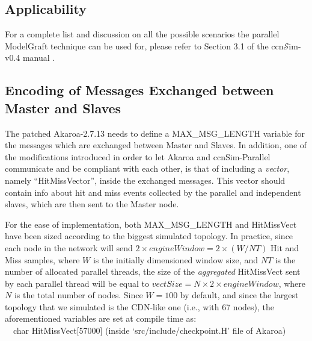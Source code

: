 \documentclass[10pt]{article}
\newcommand{\ccnsim}{ccn\ensuremath{\mathcal{S}}im} %
\begin{document}
\subsection*{Applicability}
For a complete list and discussion on all the possible scenarios the parallel ModelGraft technique can be used for, please refer to Section 3.1 of the \ccnsim-v0.4 manual \cite{ccnSim}.  

\subsection*{Encoding of Messages Exchanged between Master and Slaves}
The patched Akaroa-2.7.13 needs to define a MAX\_MSG\_LENGTH variable for the messages which are exchanged between Master and Slaves. 
In addition, one of the modifications introduced in order to let Akaroa and ccnSim-Parallel communicate and be compliant with each other, is that of including a \emph{vector}, namely ``HitMissVector'', inside the exchanged messages. This vector should contain info about hit and miss events collected by the parallel and independent slaves, which are then sent to the Master node. 


For the ease of implementation, both MAX\_MSG\_LENGTH and HitMissVect have been sized according to the biggest simulated topology. In practice, since each node in the network will send $2 \times engineWindow = 2 \times (W/NT)$ Hit and Miss samples, where $W$ is the initially dimensioned window size, and $NT$ is the number of allocated parallel threads, the size of the \emph{aggregated} HitMissVect sent by each parallel thread will be equal to  $vectSize = N \times 2 \times engineWindow$, where $N$ is the total number of nodes. 
Since $W=100$ by default, and since the largest topology that we simulated is the CDN-like one (i.e., with 67 nodes), the aforementioned variables are set at compile time as: \\

\ \ char HitMissVect[57000] (inside `src/include/checkpoint.H' file of Akaroa)
\end{document}
